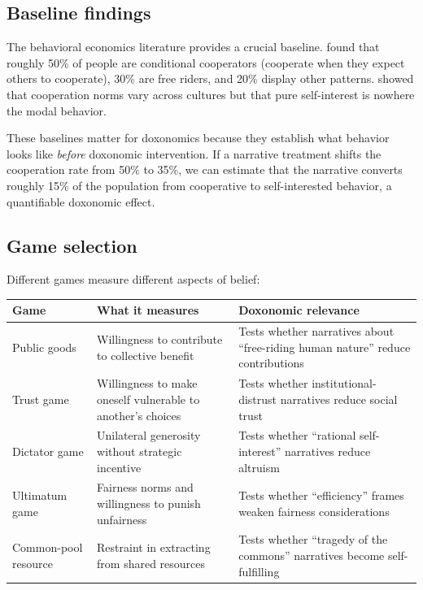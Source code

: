 \subsection{Baseline findings}

The behavioral economics literature provides a crucial baseline.
\textcite{fischbacher2001} found that roughly 50\% of people are conditional cooperators (cooperate when they expect others to cooperate), 30\% are free riders, and 20\% display other patterns.
\textcite{henrich2001} showed that cooperation norms vary across cultures but that pure self-interest is nowhere the modal behavior.

These baselines matter for doxonomics because they establish what behavior looks like \emph{before} doxonomic intervention.
If a narrative treatment shifts the cooperation rate from 50\% to 35\%, we can estimate that the narrative converts roughly 15\% of the population from cooperative to self-interested behavior, a quantifiable doxonomic effect.

\subsection{Game selection}

Different games measure different aspects of belief:

\begin{center}
\begin{tabular}{p{3cm}p{4.5cm}p{4.5cm}}
\toprule
Game & What it measures & Doxonomic relevance \\
\midrule
Public goods & Willingness to contribute to collective benefit & Tests whether narratives about ``free-riding human nature'' reduce contributions \\[4pt]
Trust game & Willingness to make oneself vulnerable to another's choices & Tests whether institutional-distrust narratives reduce social trust \\[4pt]
Dictator game & Unilateral generosity without strategic incentive & Tests whether ``rational self-interest'' narratives reduce altruism \\[4pt]
Ultimatum game & Fairness norms and willingness to punish unfairness & Tests whether ``efficiency'' frames weaken fairness considerations \\[4pt]
Common-pool resource & Restraint in extracting from shared resources & Tests whether ``tragedy of the commons'' narratives become self-fulfilling \\
\bottomrule
\end{tabular}
\end{center}

